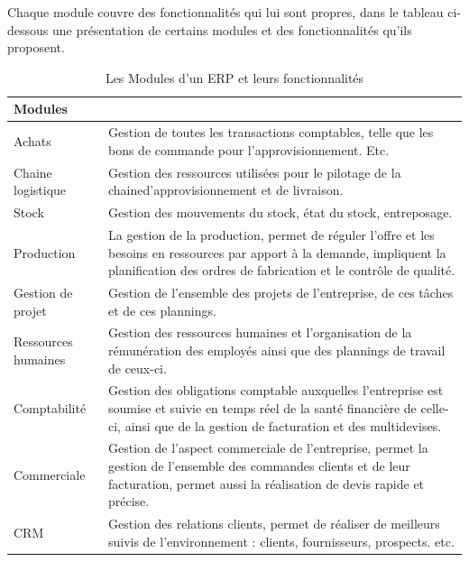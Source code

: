         Chaque module couvre des fonctionnalités qui lui sont propres, dans le tableau ci-dessous une présentation de certains modules et des fonctionnalités qu’ils proposent.

        \begin{table}[H]
        \begin{center}

        \begin{tabular}{|F{4cm}|R{10cm}|}
        \hline
        \textbf{Modules}  &  \\
        \hline
        Achats
        &
        Gestion de toutes les transactions comptables, telle que les bons de commande pour l’approvisionnement. Etc.\\

        \hline
        Chaine logistique
        &
        Gestion des ressources utilisées pour le pilotage de la chained’approvisionnement et de livraison.\\

        \hline
        Stock
        &
        Gestion des mouvements du stock, état du stock, entreposage.\\

        \hline
        Production
        &
        La gestion de la production, permet de réguler l’offre et les besoins en
        ressources par apport à la demande, impliquent la planification des ordres
        de fabrication et le contrôle de qualité.\\
        
        \hline
        Gestion de projet
        &
        Gestion de l’ensemble des projets de l’entreprise, de ces tâches et de ces plannings.\\

        \hline
        Ressources humaines
        &
        Gestion des ressources humaines et l’organisation de la rémunération des employés ainsi que des plannings de travail de ceux-ci.\\
        

        \hline
        Comptabilité
        &
        Gestion des obligations comptable auxquelles l’entreprise est soumise et suivie en temps réel de la santé financière de celle-ci, ainsi que de la gestion de facturation et des multidevises.\\

        \hline
        Commerciale
        &
        Gestion de l’aspect commerciale de l’entreprise, permet la gestion de l’ensemble des commandes clients et de leur facturation, permet aussi la réalisation de devis rapide et précise.\\

        \hline
        CRM
        &
        Gestion des relations clients, permet de réaliser de meilleurs suivis de
        l’environnement : clients, fournisseurs, prospects. etc.\\
 
        
        \hline
        \end{tabular}	
        \caption{Les Modules d'un ERP et leurs fonctionnalités}
            \end{center}
        \end{table}	

